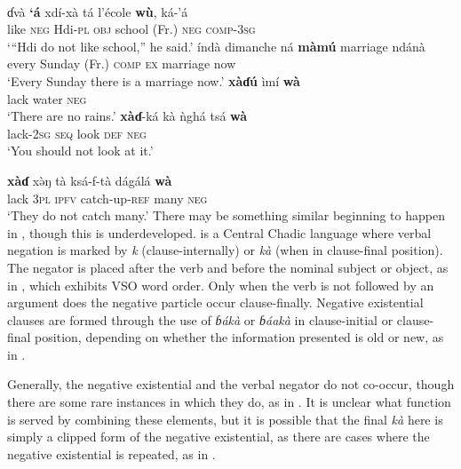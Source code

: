 \documentclass[output=paper,draft,draftmode,colorlinks,citecolor=brown]{langscibook}
\begin{document}
\newpage
\ea\label{ex:hdi-school-marriage-rain-look-catch}
\\

\ea\label{ex:hdi-school}
\gll ɗvà \textbf{`á} xdí-xà tá
l'école \textbf{wù}, ká-'á\\ like \textsc{neg} Hdi-\textsc{pl}
\textsc{obj} {school (Fr.)} \textsc{neg} \textsc{comp-3sg}\\
\glt `{}``Hdi do not like school,'' he said.'
\ex\label{ex:hdi-marriage}
\gll índà
dimanche ná \textbf{màm\'u} marriage ndánà\\ every {Sunday (Fr.)}
\textsc{comp} \textsc{ex} marriage now\\
\glt `Every Sunday there is a marriage now.'
\ex\label{ex:hdi-rain}
\gll \textbf{xàɗ\'u} {ì}mí{}
\textbf{wà}\\ lack water \textsc{neg}\\
\glt `There are no rains.'
\ex\label{ex:hdi-look}
\gll \textbf{xàɗ}-ká kà \`nghá tsá
\textbf{wà}\\ lack-2\textsc{sg} \textsc{seq} look \textsc{def}
\textsc{neg}\\
\glt `You should not look at it.' \ex\label{ex:hdi-catch}

\gll \textbf{xàɗ} x\`əŋ tà ksá-f-tà dágálá \textbf{wà}\\
lack 3\textsc{pl} \textsc{ipfv} catch-up-\textsc{ref} many \textsc{neg}\\

\glt `They do not catch many.'
\z
\z There may be something similar
beginning to happen in , though this is underdeveloped.
 is a Central Chadic language where verbal negation is marked
by \textit{k} (clause-internally) or \textit{kà} (when in clause-final
position). The negator is placed after the verb and before the nominal
subject or object, as in , which exhibits VSO word order. Only when the verb is not
followed by an argument does the negative particle occur clause-finally.
Negative existential clauses are formed through the use of
\textit{ɓákà} or \textit{ɓáakà} in clause-initial or clause-final
position, depending on whether the information presented is old or new, as
in . 
  
Generally, the negative existential and the verbal negator do not co-occur, though there are some rare instances in which they do, as in . It is unclear what function is served by combining these elements, but it is possible that the final \textit{kà} here is simply a clipped form of the negative existential, as there are cases where the negative existential is repeated, as in .
\end{document}
